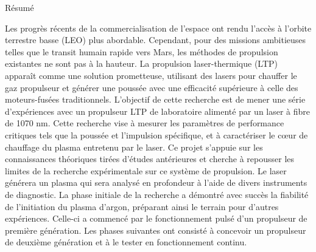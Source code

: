 
\begin{plainchp}{Résumé}

    Les progrès récents de la commercialisation de l'espace ont rendu l'accès à l'orbite terrestre basse (LEO) plus abordable. Cependant, pour des missions ambitieuses telles que le transit humain rapide vers Mars, les méthodes de propulsion existantes ne sont pas à la hauteur. La propulsion laser-thermique (LTP) apparaît comme une solution prometteuse, utilisant des lasers pour chauffer le gaz propulseur et générer une poussée avec une efficacité supérieure à celle des moteurs-fusées traditionnels. L'objectif de cette recherche est de mener une série d'expériences avec un propulseur LTP de laboratoire alimenté par un laser à fibre de 1070 nm. Cette recherche vise à mesurer les paramètres de performance critiques tels que la poussée et l'impulsion spécifique, et à caractériser le cœur de chauffage du plasma entretenu par le laser. Ce projet s'appuie sur les connaissances théoriques tirées d'études antérieures et cherche à repousser les limites de la recherche expérimentale sur ce système de propulsion. Le laser générera un plasma qui sera analysé en profondeur à l'aide de divers instruments de diagnostic. La phase initiale de la recherche a démontré avec succès la fiabilité de l'initiation du plasma d'argon, préparant ainsi le terrain pour d'autres expériences. Celle-ci a commencé par le fonctionnement pulsé d'un propulseur de première génération. Les phases suivantes ont consisté à concevoir un propulseur de deuxième génération et à le tester en fonctionnement continu.
    
\end{plainchp}
